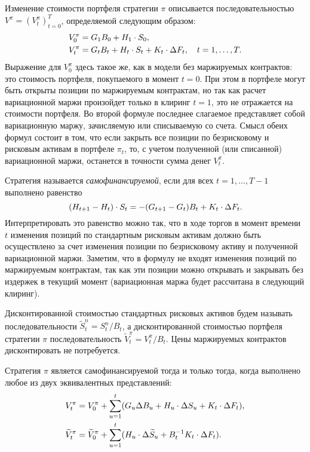Изменение стоимости портфеля стратегии $\pi$ описывается последовательностью $V^\pi=(V_t^\pi)_{t=0}^T$, определяемой следующим образом:
\begin{align}
\label{fut:v-0}
&V_0^\pi = G_1B_0 + {H_1}\cdot{S_0},\\
\label{fut:v-t}
&V_t^\pi = G_tB_t + {H_t}\cdot{S_t} + {K_t}\cdot{\Delta F_t}, \quad t=1,\dots,T.
\end{align}
Выражение для $V_0^\pi$ здесь такое же, как в модели без маржируемых контрактов: это стоимость портфеля, покупаемого в момент $t=0$. При этом в портфеле могут быть открыты позиции по маржируемым контрактам, но так как расчет вариационной маржи произойдет только в клиринг $t=1$, это не отражается на стоимости портфеля.
Во второй формуле последнее слагаемое представляет собой вариационную маржу, зачисляемую или списываемую со счета.
Смысл обеих формул состоит в том, что если закрыть все позиции по безрисковому и рисковым активам в портфеле $\pi_t$, то, с учетом полученной (или списанной) вариационной маржи, останется в точности сумма денег $V_t^\pi$. 

Стратегия называется \emph{самофинансируемой}, если для всех $t=1,\dots,T-1$ выполнено равенство 
\begin{equation}
\label{fut:sf}
{(H_{t+1}-H_t)}\cdot{S_t}  = -(G_{t+1}-G_t)B_t + {K_t}\cdot{\Delta F_t}.
\end{equation}
Интерпретировать это равенство можно так, что в ходе торгов в момент времени $t$ изменения позиций по стандартным рисковым активам должно быть осуществлено за счет изменения позиции по безрисковому активу и полученной вариационной маржи. 
Заметим, что в формулу не входят изменения позиций по маржируемым контрактам, так как эти позиции можно открывать и закрывать без издержек в текущий момент (вариационная маржа будет рассчитана в следующий клиринг).

Дисконтированной стоимостью стандартных рисковых активов будем называть последовательности $\tilde S_t^n = S_t^n/B_t$, а дисконтированной стоимостью портфеля стратегии $\pi$ последовательность $\tilde V_t^\pi = V_t^\pi/B_t$.
Цены маржируемых контрактов дисконтировать не потребуется.

\begin{proposition}
Стратегия $\pi$ является самофинансируемой тогда и только тогда, когда выполнено любое из двух эквивалентных представлений:
\begin{align}
\label{fut:sf-eq-1}
&V_t^\pi = V_0^\pi + \sum_{u=1}^t (G_u\Delta B_u + {H_u}\cdot{\Delta S_u} + {K_t}\cdot{\Delta} F_t),\\
\label{fut:sf-eq-2}
&\widetilde V_t^\pi = \widetilde V_0^\pi + \sum_{u=1}^t ({H_u}\cdot{\Delta \widetilde S_u} + B_t^{-1}{K_t}\cdot{\Delta} F_t).
\end{align}
\end{proposition}

